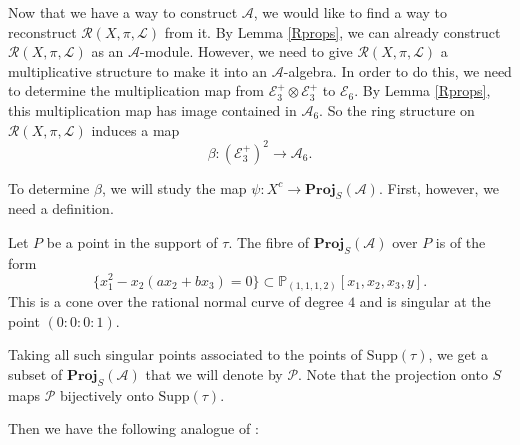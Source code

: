 \documentclass{amsart}
\begin{document}
Now that we have a way to construct ${\mathcal{A}}$, we would like to find a way to reconstruct ${\mathcal{R}}(X,\pi,{\mathcal{L}})$ from it. By Lemma \ref{Rprops}, we can already construct ${\mathcal{R}}(X,\pi,{\mathcal{L}})$ as an \mbox{${\mathcal{A}}$-module}. However, we need to give ${\mathcal{R}}(X,\pi,{\mathcal{L}})$ a multiplicative structure to make it into an ${\mathcal{A}}$-algebra. In order to do this, we need to determine the multiplication map from ${\mathcal{E}}_3^+ \otimes {\mathcal{E}}_3^+$ to ${\mathcal{E}}_6$. By Lemma \ref{Rprops}, this multiplication map has image contained in ${\mathcal{A}}_6$. So the ring structure on ${\mathcal{R}}(X,\pi,{\mathcal{L}})$ induces a map
\[\beta\colon ({\mathcal{E}}_3^+)^2 \longrightarrow {\mathcal{A}}_6.\]

To determine $\beta$, we will study the map $\psi\colon X^c \to \mathbf{Proj}_S({\mathcal{A}})$. First, however, we need a definition.

\begin{defn} \label{Pdefn} Let $P$ be a point in the support of $\tau$. The fibre of $\mathbf{Proj}_S({\mathcal{A}})$ over $P$ is of the form
\[\{x_1^2 - x_2(ax_2 +bx_3) = 0\} \subset {\mathbb{P}}_{(1,1,1,2)}[x_1,x_2,x_3,y].\]
This is a cone over the rational normal curve of degree $4$ and is singular at the point $(0\!:\!0\!:\!0\!:\!1)$.

Taking all such singular points associated to the points of $\mathrm{Supp}(\tau)$, we get a subset of $\mathbf{Proj}_S({\mathcal{A}})$ that we will denote by ${\mathcal{P}}$. Note that the projection onto $S$ maps ${\mathcal{P}}$ bijectively onto $\mathrm{Supp}(\tau)$.
\end{defn}

Then we have the following analogue of \cite[Theorem 4.7]{flgi}:
\end{document}
